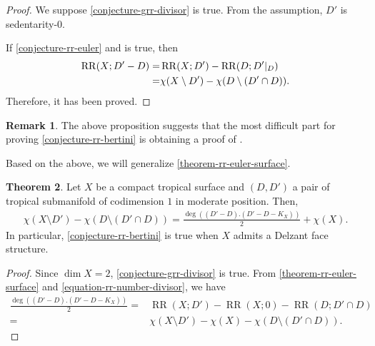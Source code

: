 \documentclass[a4paper,dvipdfmx,reqno,12pt]{amsart}
\theoremstyle{definition}
\newtheorem{theorem}{Theorem}[section]
\newtheorem{remark}[theorem]{Remark}
\newcommand{\opn}[1]{\operatorname{#1}}
\numberwithin{equation}{section}
\begin{document}
\begin{proof}
We suppose \cref{conjecture-grr-divisor} is true.
From the assumption, 
$D'$ is sedentarity-$0$. 


If \cref{conjecture-rr-euler} and 
\cite[Conjecture 6.13]{demedrano2023chern} is true,
then
\begin{align}
\opn{RR}(X;D'-D)=&\opn{RR}(X;D')-
\opn{RR}(D;D'|_{D}) \notag \\
=&\chi(X\setminus D')-\chi(D\setminus (D'\cap D)). \notag
\end{align}
Therefore, it has been proved.
\end{proof}

\begin{remark}
The above proposition suggests that the most difficult part
for proving \cref{conjecture-rr-bertini} is obtaining a proof of
\cite[Conjecture 6.13]{demedrano2023chern}.
\end{remark}

Based on the above, we will generalize
\cref{theorem-rr-euler-surface}.

\begin{theorem}
\label{theorem-rr-bertini-surface}
Let $X$ be a compact tropical surface
and $(D,D')$ a pair of tropical submanifold of
codimension $1$ in moderate position. Then,
\begin{align}
\chi(X\setminus D')-\chi(D\setminus (D'\cap D))
=\frac{\opn{deg}((D'-D).(D'-D-K_X))}{2}+\chi(X).
\end{align}
In particular, \cref{conjecture-rr-bertini} is true 
when $X$ admits a Delzant face structure.
\end{theorem}

\begin{proof}
Since $\dim X=2$, 
\cref{conjecture-grr-divisor} is true.
From \cref{theorem-rr-euler-surface} and 
\eqref{equation-rr-number-divisor}, we have
\begin{align}
\frac{\opn{deg}((D'-D).(D'-D-K_X))}{2}=&
\opn{RR}(X;D')-\opn{RR}(X;0)-
\opn{RR}(D;D'\cap D) \\
=&\chi(X\setminus D')-\chi(X)-\chi(D\setminus (D'\cap D)).
\end{align}
\end{proof}
\end{document}
